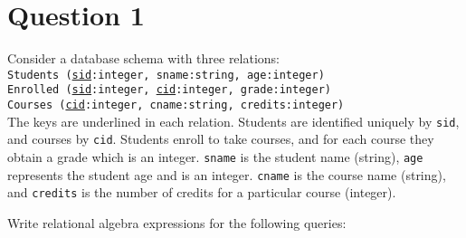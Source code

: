 
\section*{Question 1}

Consider a database schema with three relations:\\

\texttt{Students (\underline{sid}:integer, sname:string, age:integer)}\\
\texttt{Enrolled (\underline{sid}:integer, \underline{cid}:integer, grade:integer)}\\
\texttt{Courses  (\underline{cid}:integer, cname:string, credits:integer)}\\

The keys are underlined in each relation. Students are identified uniquely by \texttt{sid}, and courses by \texttt{cid}.
Students enroll to take courses, and for each course they obtain a grade which is an integer. \texttt{sname} is
the student name (string), \texttt{age} represents the student age and is an integer. \texttt{cname} is the course name (string), and \texttt{credits} is the number of credits for a particular course (integer).

Write relational algebra expressions for the following queries:

